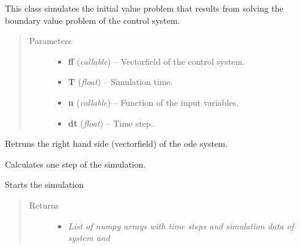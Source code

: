 \documentclass[letterpaper,10pt,english]{sphinxmanual}
\begin{document}
\begin{fulllineitems}
\label{pytrajectory:pytrajectory.simulation.Simulation}
This class simulates the initial value problem that results from solving
the boundary value problem of the control system.
\begin{quote}\begin{description}
\item[{Parameters}] \leavevmode\begin{itemize}
\item {} 
\textbf{ff} (\emph{callable}) -- Vectorfield of the control system.

\item {} 
\textbf{T} (\emph{float}) -- Simulation time.

\item {} 
\textbf{u} (\emph{callable}) -- Function of the input variables.

\item {} 
\textbf{dt} (\emph{float}) -- Time step.

\end{itemize}

\end{description}\end{quote}

\begin{fulllineitems}
\label{pytrajectory:pytrajectory.simulation.Simulation.rhs}
Retruns the right hand side (vectorfield) of the ode system.

\end{fulllineitems}


\begin{fulllineitems}
\label{pytrajectory:pytrajectory.simulation.Simulation.calcStep}
Calculates one step of the simulation.

\end{fulllineitems}


\begin{fulllineitems}
\label{pytrajectory:pytrajectory.simulation.Simulation.simulate}
Starts the simulation
\begin{quote}\begin{description}
\item[{Returns}] \leavevmode
\begin{itemize}
\item {} 
\emph{List of numpy arrays with time steps and simulation data of system and}


\end{itemize}
\end{description}
\end{quote}
\end{fulllineitems}
\end{fulllineitems}
\end{document}

